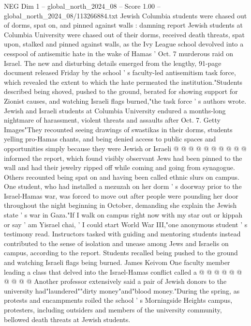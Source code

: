 \begin{textsample}{NEG Dim 1 – global\_north\_2024\_08 – Score 1.00 – global\_north\_2024\_08/113266884.txt}  \label{ex:f1_neg_043}
Jewish Columbia students were chased out of dorms, spat on, and pinned against walls : damning report Jewish students at Columbia University were chased out of their dorms, received death threats, spat upon, stalked and pinned against walls, as the Ivy League school devolved into a cesspool of antisemitic hate in the wake of Hamas ' Oct. 7 murderous raid on Israel.
The new and disturbing details emerged from the lengthy, 91-page document released Friday by the school ' s faculty-led antisemitism task force, which revealed the extent to which the hate permeated the institution."Students described being shoved, pushed to the ground, berated for showing support for Zionist causes, and watching Israeli flags burned,"the task force ' s authors wrote.
Jewish and Israeli students at Columbia University endured a months-long nightmare of harassment, violent threats and assaults after Oct. 7.
Getty Images"They recounted seeing drawings of swastikas in their dorms, students yelling pro-Hamas chants, and being denied access to public spaces and opportunities simply because they were Jewish or Israeli @ @ @ @ @ @ @ @ @ @ informed the report, which found visibly observant Jews had been pinned to the wall and had their jewelry ripped off while coming and going from synagogue.
Others recounted being spat on and having been called ethnic slurs on campus.
One student, who had installed a mezuzah on her dorm ' s doorway prior to the Israel-Hamas war, was forced to move out after people were pounding her door throughout the night beginning in October, demanding she explain the Jewish state ' s war in Gaza."If I walk on campus right now with my star out or kippah or say ' am Yisrael chai, ' I could start World War III,"one anonymous student ' s testimony read.
Instructors tasked with guiding and mentoring students instead contributed to the sense of isolation and unease among Jews and Israelis on campus, according to the report.
Students recalled being pushed to the ground and watching Israeli flags being burned.
James Keivom One faculty member leading a class that delved into the Israel-Hamas conflict called a @ @ @ @ @ @ @ @ @ @ Another professor extensively said a pair of Jewish donors to the university had"laundered""dirty money"and"blood money."During the spring, as protests and encampments roiled the school ' s Morningside Heights campus, protesters, including outsiders and members of the university community, bellowed death threats at Jewish students.

\end{textsample}
